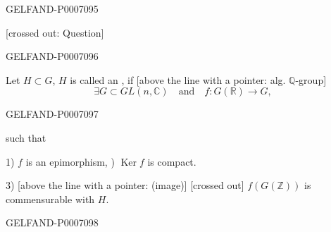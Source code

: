 \begin{GelfandAdjacentEvidence}{GELFAND-P000709}{5}


[crossed out: Question]
\end{GelfandAdjacentEvidence}
\begin{GelfandAdjacentEvidence}{GELFAND-P000709}{6}


Let \(H\subset G\), \(H\) is called an ,
if [above the line with a pointer: alg. \(\mathbb Q\)-group]
\[
\exists G\subset GL(n,\mathbb C)\quad\text{and}\quad
f:G(\mathbb R)\longrightarrow G,
\]
\end{GelfandAdjacentEvidence}
\begin{GelfandAdjacentEvidence}{GELFAND-P000709}{7}


such that

1) \(f\) is an epimorphism, ) \(\operatorname{Ker} f\) is compact.

3) [above the line with a pointer: (image)] [crossed out]
\(f(G(\mathbb Z))\) is commensurable with \(H\).
\end{GelfandAdjacentEvidence}
\begin{GelfandAdjacentEvidence}{GELFAND-P000709}{8}

\end{GelfandAdjacentEvidence}



